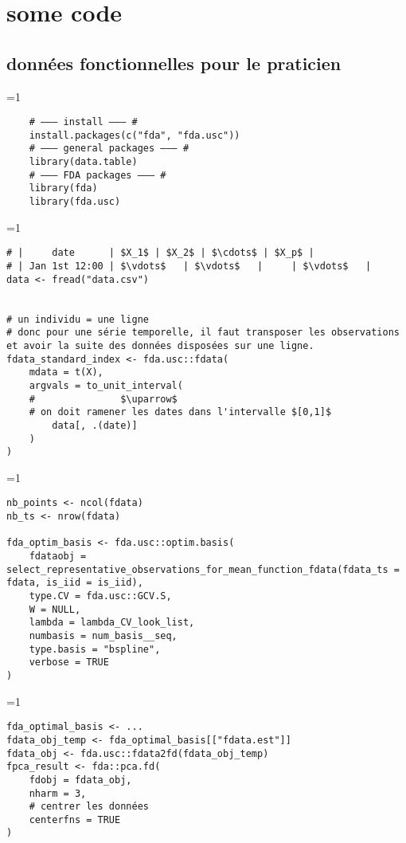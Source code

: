 \chapter{some code}

\section*{données fonctionnelles pour le praticien}

\ifnum\value{code}=1
	\begin{verbatim}
    # ——— install ——— #
    install.packages(c("fda", "fda.usc"))
    # ——— general packages ——— #
    library(data.table)
    # ——— FDA packages ——— #
    library(fda)
    library(fda.usc)
\end{verbatim}
\fi

\ifnum\value{code}=1
	\begin{verbatim} 
# |     date      | $X_1$ | $X_2$ | $\cdots$ | $X_p$ |
# | Jan 1st 12:00 | $\vdots$   | $\vdots$   |     | $\vdots$   |
data <- fread("data.csv")


# un individu = une ligne
# donc pour une série temporelle, il faut transposer les observations et avoir la suite des données disposées sur une ligne.
fdata_standard_index <- fda.usc::fdata(
    mdata = t(X),
    argvals = to_unit_interval(
    #               $\uparrow$
    # on doit ramener les dates dans l'intervalle $[0,1]$
        data[, .(date)]
    )
)
\end{verbatim}
\fi

\ifnum\value{code}=1
	\begin{verbatim}
nb_points <- ncol(fdata)
nb_ts <- nrow(fdata)
 
fda_optim_basis <- fda.usc::optim.basis(
    fdataobj = select_representative_observations_for_mean_function_fdata(fdata_ts = fdata, is_iid = is_iid),
    type.CV = fda.usc::GCV.S,
    W = NULL,
    lambda = lambda_CV_look_list,
    numbasis = num_basis__seq,
    type.basis = "bspline",
    verbose = TRUE
)
\end{verbatim}
\fi

\ifnum\value{code}=1
	\begin{verbatim}
fda_optimal_basis <- ...
fdata_obj_temp <- fda_optimal_basis[["fdata.est"]]
fdata_obj <- fda.usc::fdata2fd(fdata_obj_temp)
fpca_result <- fda::pca.fd(
    fdobj = fdata_obj,
    nharm = 3,
    # centrer les données
    centerfns = TRUE
)
\end{verbatim}
\fi

